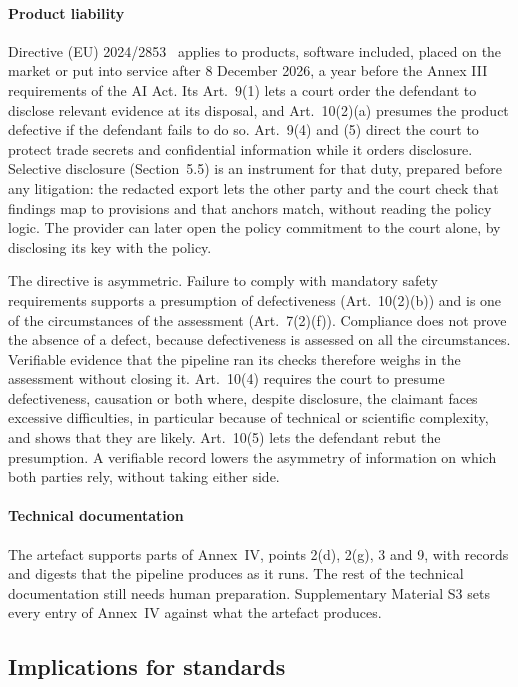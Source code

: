 \paragraph{Product liability} Directive (EU) 2024/2853~\cite{pld_2024} applies to products, software included, placed on the market or put into service after 8 December 2026, a year before the Annex III requirements of the AI Act. Its Art.~9(1) lets a court order the defendant to disclose relevant evidence at its disposal, and Art.~10(2)(a) presumes the product defective if the defendant fails to do so. Art.~9(4) and (5) direct the court to protect trade secrets and confidential information while it orders disclosure. Selective disclosure (Section~5.5) is an instrument for that duty, prepared before any litigation: the redacted export lets the other party and the court check that findings map to provisions and that anchors match, without reading the policy logic. The provider can later open the policy commitment to the court alone, by disclosing its key with the policy.

The directive is asymmetric. Failure to comply with mandatory safety requirements supports a presumption of defectiveness (Art.~10(2)(b)) and is one of the circumstances of the assessment (Art.~7(2)(f)). Compliance does not prove the absence of a defect, because defectiveness is assessed on all the circumstances. Verifiable evidence that the pipeline ran its checks therefore weighs in the assessment without closing it. Art.~10(4) requires the court to presume defectiveness, causation or both where, despite disclosure, the claimant faces excessive difficulties, in particular because of technical or scientific complexity, and shows that they are likely. Art.~10(5) lets the defendant rebut the presumption. A verifiable record lowers the asymmetry of information on which both parties rely, without taking either side.

\paragraph{Technical documentation} The artefact supports parts of Annex~IV, points 2(d), 2(g), 3 and 9, with records and digests that the pipeline produces as it runs. The rest of the technical documentation still needs human preparation. Supplementary Material S3 sets every entry of Annex~IV against what the artefact produces.

\subsection{Implications for standards}
\label{sec:disc-standards}

